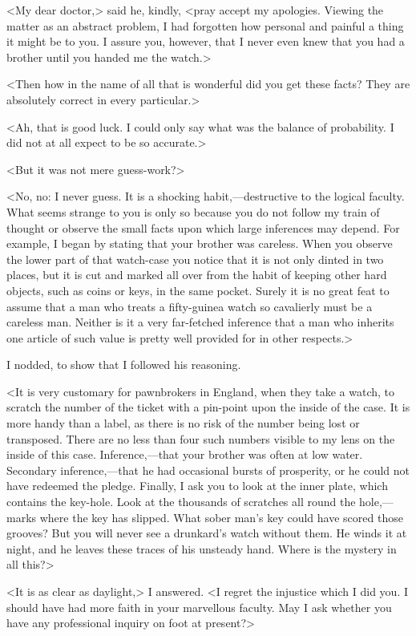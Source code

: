 <My dear doctor,> said he, kindly, <pray accept my apologies. Viewing the matter as an abstract problem, I had forgotten how personal and painful a thing it might be to you. I assure you, however, that I never even knew that you had a brother until you handed me the watch.>

<Then how in the name of all that is wonderful did you get these facts? They are absolutely correct in every particular.>

<Ah, that is good luck. I could only say what was the balance of probability. I did not at all expect to be so accurate.>

<But it was not mere guess-work?>

<No, no: I never guess. It is a shocking habit,—destructive to the logical faculty. What seems strange to you is only so because you do not follow my train of thought or observe the small facts upon which large inferences may depend. For example, I began by stating that your brother was careless. When you observe the lower part of that watch-case you notice that it is not only dinted in two places, but it is cut and marked all over from the habit of keeping other hard objects, such as coins or keys, in the same pocket. Surely it is no great feat to assume that a man who treats a fifty-guinea watch so cavalierly must be a careless man. Neither is it a very far-fetched inference that a man who inherits one article of such value is pretty well provided for in other respects.>

I nodded, to show that I followed his reasoning.

<It is very customary for pawnbrokers in England, when they take a watch, to scratch the number of the ticket with a pin-point upon the inside of the case. It is more handy than a label, as there is no risk of the number being lost or transposed. There are no less than four such numbers visible to my lens on the inside of this case. Inference,—that your brother was often at low water. Secondary inference,—that he had occasional bursts of prosperity, or he could not have redeemed the pledge. Finally, I ask you to look at the inner plate, which contains the key-hole. Look at the thousands of scratches all round the hole,—marks where the key has slipped. What sober man's key could have scored those grooves? But you will never see a drunkard's watch without them. He winds it at night, and he leaves these traces of his unsteady hand. Where is the mystery in all this?>

<It is as clear as daylight,> I answered. <I regret the injustice which I did you. I should have had more faith in your marvellous faculty. May I ask whether you have any professional inquiry on foot at present?>


